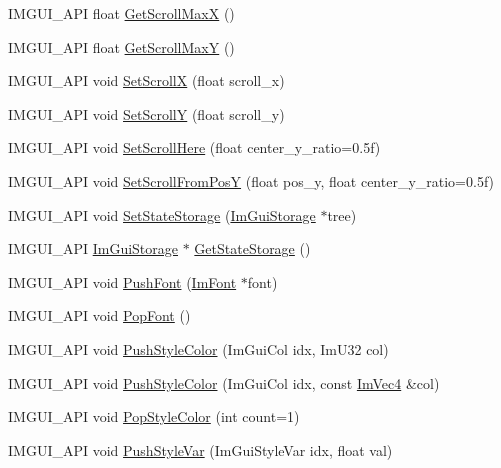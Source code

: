 \begin{DoxyCompactItemize}
\item 
I\+M\+G\+U\+I\+\_\+\+A\+PI float \hyperlink{namespace_im_gui_af472cb090157c22e65a0aa1662b9f3d0}{Get\+Scroll\+MaxX} ()
\item 
I\+M\+G\+U\+I\+\_\+\+A\+PI float \hyperlink{namespace_im_gui_ab34c0d5c63908a7ff50923151730f76a}{Get\+Scroll\+MaxY} ()
\item 
I\+M\+G\+U\+I\+\_\+\+A\+PI void \hyperlink{namespace_im_gui_a0796750de8c50555d895f63e79ac87f0}{Set\+ScrollX} (float scroll\+\_\+x)
\item 
I\+M\+G\+U\+I\+\_\+\+A\+PI void \hyperlink{namespace_im_gui_a41833555962807384432e6fc94d46ec9}{Set\+ScrollY} (float scroll\+\_\+y)
\item 
I\+M\+G\+U\+I\+\_\+\+A\+PI void \hyperlink{namespace_im_gui_aa60ea4a42b8d03d27431f8e79b9f0254}{Set\+Scroll\+Here} (float center\+\_\+y\+\_\+ratio=0.\+5f)
\item 
I\+M\+G\+U\+I\+\_\+\+A\+PI void \hyperlink{namespace_im_gui_a57d8e9497ad39584ba740cef70b78fb4}{Set\+Scroll\+From\+PosY} (float pos\+\_\+y, float center\+\_\+y\+\_\+ratio=0.\+5f)
\item 
I\+M\+G\+U\+I\+\_\+\+A\+PI void \hyperlink{namespace_im_gui_a635f4511603cc6284d8b21fb8d53090d}{Set\+State\+Storage} (\hyperlink{struct_im_gui_storage}{Im\+Gui\+Storage} $\ast$tree)
\item 
I\+M\+G\+U\+I\+\_\+\+A\+PI \hyperlink{struct_im_gui_storage}{Im\+Gui\+Storage} $\ast$ \hyperlink{namespace_im_gui_aa2b8fa1a5320cd70f23a53d8fe604fb2}{Get\+State\+Storage} ()
\item 
I\+M\+G\+U\+I\+\_\+\+A\+PI void \hyperlink{namespace_im_gui_ac5a59f4f8226fd35786d8973c85b85a9}{Push\+Font} (\hyperlink{struct_im_font}{Im\+Font} $\ast$font)
\item 
I\+M\+G\+U\+I\+\_\+\+A\+PI void \hyperlink{namespace_im_gui_af66649bc37022bf3cf2496c73af9a499}{Pop\+Font} ()
\item 
I\+M\+G\+U\+I\+\_\+\+A\+PI void \hyperlink{namespace_im_gui_a77ee84afb636e05eb4b2d6eeddcc2aa8}{Push\+Style\+Color} (Im\+Gui\+Col idx, Im\+U32 col)
\item 
I\+M\+G\+U\+I\+\_\+\+A\+PI void \hyperlink{namespace_im_gui_a5bd052ebf55015312a53739974950e7b}{Push\+Style\+Color} (Im\+Gui\+Col idx, const \hyperlink{struct_im_vec4}{Im\+Vec4} \&col)
\item 
I\+M\+G\+U\+I\+\_\+\+A\+PI void \hyperlink{namespace_im_gui_a9795f730b4043a98b6254738d86efcdc}{Pop\+Style\+Color} (int count=1)
\item 
I\+M\+G\+U\+I\+\_\+\+A\+PI void \hyperlink{namespace_im_gui_aab3f43009094462cf2a5eb554785949b}{Push\+Style\+Var} (Im\+Gui\+Style\+Var idx, float val)

\end{DoxyCompactItemize}
